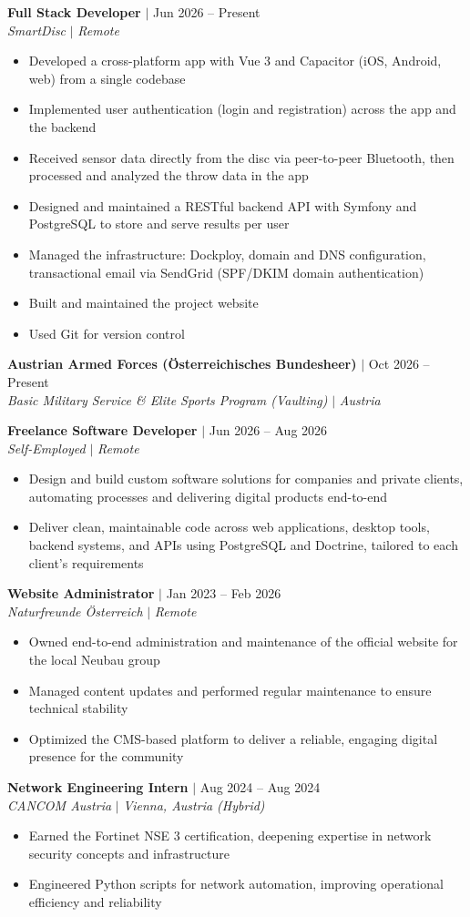 \documentclass[letterpaper,11pt]{article}
\newcommand{\resumeItem}[1]{
  \item\small{
    {#1 \vspace{-2pt}}
  }
}
\newcommand{\resumeSubheading}[4]{
  \vspace{-2pt}\item
    \textbf{#1} $|$ #2 \\
    \textit{\small#3} $|$ \textit{\small #4} \\
  \vspace{-7pt}
}
\newcommand{\resumeItemListStart}{\begin{itemize}}
\newcommand{\resumeItemListEnd}{\end{itemize}\vspace{-5pt}}
\begin{document}
    \resumeSubheading
      {Full Stack Developer}{Jun 2026 -- Present}
      {SmartDisc}{Remote}
      \resumeItemListStart
        \resumeItem{Developed a cross-platform app with Vue 3 and Capacitor (iOS, Android, web) from a single codebase}
        \resumeItem{Implemented user authentication (login and registration) across the app and the backend}
        \resumeItem{Received sensor data directly from the disc via peer-to-peer Bluetooth, then processed and analyzed the throw data in the app}
        \resumeItem{Designed and maintained a RESTful backend API with Symfony and PostgreSQL to store and serve results per user}
        \resumeItem{Managed the infrastructure: Dockploy, domain and DNS configuration, transactional email via SendGrid (SPF/DKIM domain authentication)}
        \resumeItem{Built and maintained the project website}
        \resumeItem{Used Git for version control}
      \resumeItemListEnd

    \resumeSubheading
      {Austrian Armed Forces (\"Osterreichisches Bundesheer)}{Oct 2026 -- Present}
      {Basic Military Service \& Elite Sports Program (Vaulting)}{Austria}
      \vspace{10pt}

    \resumeSubheading
      {Freelance Software Developer}{Jun 2026 -- Aug 2026}
      {Self-Employed}{Remote}
      \resumeItemListStart
        \resumeItem{Design and build custom software solutions for companies and private clients, automating processes and delivering digital products end-to-end}
        \resumeItem{Deliver clean, maintainable code across web applications, desktop tools, backend systems, and APIs using PostgreSQL and Doctrine, tailored to each client's requirements}
      \resumeItemListEnd

    \resumeSubheading
      {Website Administrator}{Jan 2023 -- Feb 2026}
      {Naturfreunde \"Osterreich}{Remote}
      \resumeItemListStart
        \resumeItem{Owned end-to-end administration and maintenance of the official website for the local Neubau group}
        \resumeItem{Managed content updates and performed regular maintenance to ensure technical stability}
        \resumeItem{Optimized the CMS-based platform to deliver a reliable, engaging digital presence for the community}
      \resumeItemListEnd

    \resumeSubheading
      {Network Engineering Intern}{Aug 2024 -- Aug 2024}
      {CANCOM Austria}{Vienna, Austria (Hybrid)}
      \resumeItemListStart
        \resumeItem{Earned the Fortinet NSE 3 certification, deepening expertise in network security concepts and infrastructure}
        \resumeItem{Engineered Python scripts for network automation, improving operational efficiency and reliability}
      \resumeItemListEnd
\end{document}
